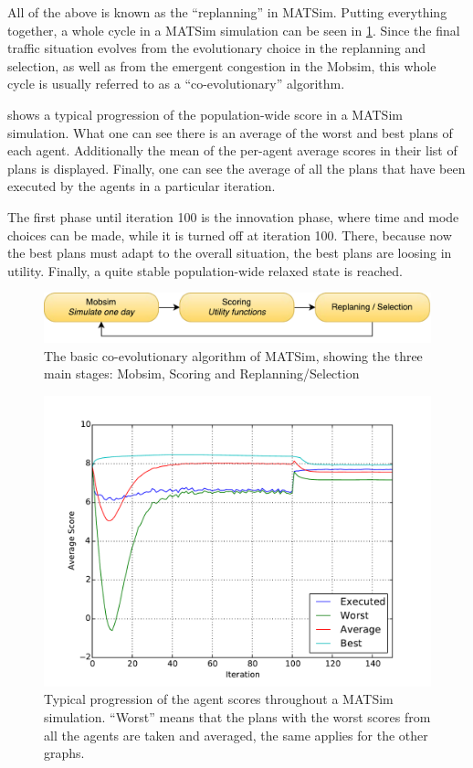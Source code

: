 All of the above is known as the ``replanning'' in MATSim. Putting everything
together, a whole cycle in a MATSim simulation can be seen in \cref{fig:matsimcycle}. Since the
final traffic situation evolves from the evolutionary choice in the replanning and
selection, as well as from the emergent congestion in the Mobsim, this whole
cycle is usually referred to as a ``co-evolutionary'' algorithm.

 shows a typical progression of the population-wide score in
a MATSim simulation. What one can see there is an average of the worst and best plans
of each agent. Additionally the mean of the per-agent average scores in their list of plans is displayed.
Finally, one can see the average of all the plans that have been executed
by the agents in a particular iteration.

The first phase until iteration 100 is the innovation phase, where time and mode
choices can be made, while it is turned off at iteration 100. There, because now
the best plans must adapt to the overall situation, the best plans are loosing in utility.
Finally, a quite stable population-wide relaxed state is reached.

\begin{figure}
    \centering
    \includegraphics[width=1.0\textwidth]{figures/matsimcycle.pdf}
    \caption{The basic co-evolutionary algorithm of MATSim, showing the three main
    stages: Mobsim, Scoring and Replanning/Selection}
    \label{fig:matsimcycle}
\end{figure}

\begin{figure}
    \centering
    \includegraphics[width=1.0\textwidth]{figures/scorestats.pdf}
    \caption{Typical progression of the agent scores throughout a MATSim simulation.
    ``Worst'' means that the plans with the worst scores from all the agents are taken
    and averaged, the same applies for the other graphs.}
    \label{fig:scorestats}
\end{figure}

